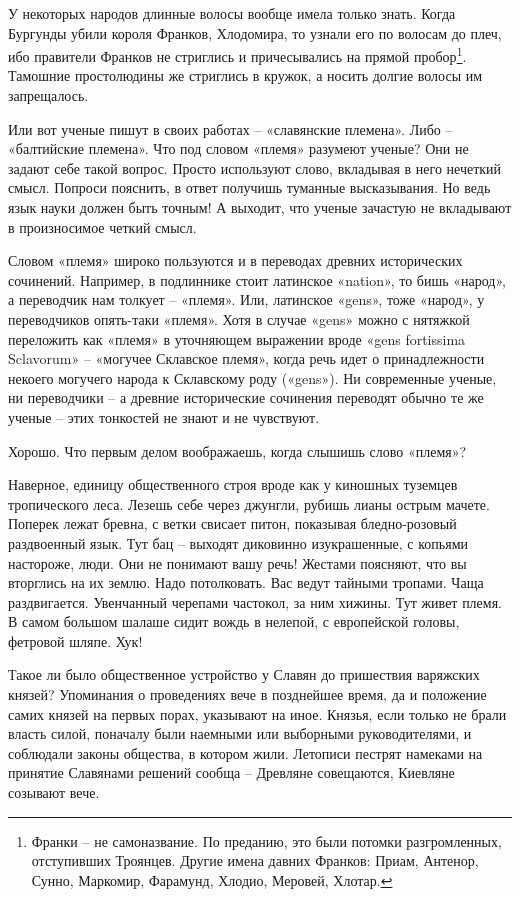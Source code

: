 У некоторых народов длинные волосы вообще имела только знать. Когда Бургунды убили короля Франков, Хлодомира, то узнали его по волосам до плеч, ибо правители Франков не стриглись и причесывались на прямой пробор\footnote{Франки – не самоназвание. По преданию, это были потомки разгромленных, отступивших Троянцев. Другие имена давних Франков: Приам, Антенор, Сунно, Маркомир, Фарамунд, Хлодио, Меровей, Хлотар.}. Тамошние простолюдины же стриглись в кружок, а носить долгие волосы им запрещалось.

Или вот ученые пишут в своих работах – «славянские племена». Либо – «балтийские племена». Что под словом «племя» разумеют ученые? Они не задают себе такой вопрос. Просто используют слово, вкладывая в него нечеткий смысл. Попроси пояснить, в ответ получишь туманные высказывания. Но ведь язык науки должен быть точным! А выходит, что ученые зачастую не вкладывают в произносимое четкий смысл.

Словом «племя» широко пользуются и в переводах древних исторических сочинений. Например, в подлиннике стоит латинское «nation», то бишь «народ», а переводчик нам толкует – «племя». Или, латинское «gens», тоже «народ», у переводчиков опять-таки «племя». Хотя в случае «gens» можно с нятяжкой переложить как «племя» в уточняющем выражении вроде «gens fortissima Sclavorum» – «могучее Склавское племя», когда речь идет о принадлежности некоего могучего народа к Скла\-вскому роду («gens»). Ни современные ученые, ни переводчики – а древние исторические сочинения переводят обычно те же ученые – этих тонкостей не знают и не чувствуют.

Хорошо. Что первым делом воображаешь, когда слышишь слово «племя»?

Наверное, единицу общественного строя вроде как у киношных туземцев тропического леса. Лезешь себе через джунгли, рубишь лианы острым мачете. Поперек лежат бревна, с ветки свисает питон, показывая бледно-розовый раздвоенный язык. Тут бац – выходят диковинно изукрашенные, с копьями настороже, люди. Они не понимают вашу речь! Жестами поясняют, что вы вторглись на их землю. Надо потолковать. Вас ведут тайными тропами. Чаща раздвигается. Увенчанный черепами частокол, за ним хижины. Тут живет племя. В самом большом шалаше сидит вождь в нелепой, с европейской головы, фетровой шляпе. Хук!

Такое ли было общественное устройство у Славян до пришествия варяжских князей? Упоминания о проведениях вече в позднейшее время, да и положение самих князей на первых порах, указывают на иное. Князья, если только не брали власть силой, поначалу были наемными или выборными руководителями, и соблюдали законы общества, в котором жили. Летописи пестрят намеками на принятие Славянами решений сообща –  Древляне совещаются, Киевляне созывают вече. 

